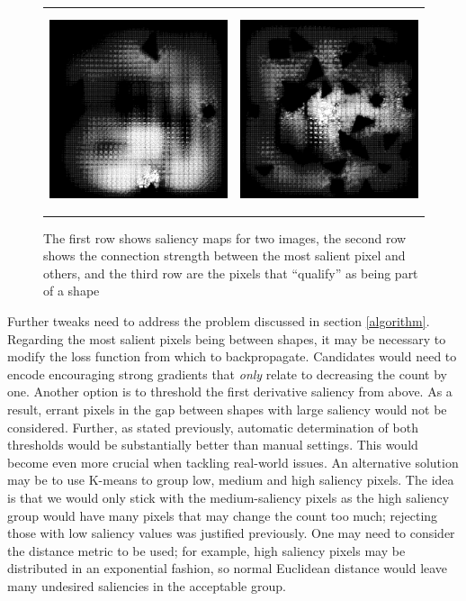 \begin{figure}
\begin{center}
\begin{tabular}{c c}
            \includegraphics[width = 2.3in, height = 2.3in]{Counting/LaTeX/figures/putasideall/nolimitscaleresamplingoptiondifferentactivationnetworkputaside/image1/1.png} & \includegraphics[width = 2.3in, height = 2.3in]{Counting/LaTeX/figures/putasideall/nolimitscaleresamplingoptiondifferentactivationnetworkputaside/image2/1.png}
        \end{tabular}
    \end{center}
    \caption{The first row shows saliency maps for two images, the second row shows the connection
             strength between the most salient pixel and others, and the third row are the pixels
             that ``qualify'' as being part of a shape}
    \label{badsaliency}
\end{figure}





Further tweaks need to address the problem discussed in section \ref{algorithm}. Regarding the most
salient pixels being between shapes, it may be necessary to modify the loss function from which to
backpropagate. Candidates would need to encode encouraging strong gradients that \textit{only}
relate to decreasing the count by one. Another option is to threshold the first derivative saliency
from above. As a result, errant pixels in the gap between shapes with large saliency would not be
considered. Further, as stated previously, automatic determination of both thresholds would be
substantially better than manual settings. This would become even more crucial when tackling
real-world issues. An alternative solution may be to use K-means to group low, medium and high
saliency pixels. The idea is that we would only stick with the medium-saliency pixels as the high
saliency group would have many pixels that may change the count too much; rejecting those with low
saliency values was justified previously. One may need to consider the distance metric to be used;
for example, high saliency pixels may be distributed in an exponential fashion, so normal Euclidean
distance would leave many undesired saliencies in the acceptable group.

